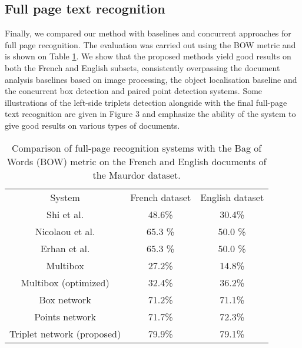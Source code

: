 \documentclass[conference]{IEEEtran}
\begin{document}
\subsection{Full page text recognition}
Finally, we compared our method with baselines and concurrent approaches for  full page recognition. The evaluation was carried out using the BOW metric and is shown on Table \ref{tab:fullPage}.
We show that the proposed methods yield good results on both the French and English subsets, consistently overpassing the document analysis baselines based on image processing, the object localisation baseline and the concurrent box detection and paired point detection systems.
Some illustrations of the left-side triplets detection alongside with the final full-page text recognition are given in Figure 3 and emphasize the ability of the system to give good results on various types of documents.

\begin{table}
\begin{center}
\caption{Comparison of full-page recognition systems with the Bag of Words (BOW) metric on the French and English documents of the Maurdor dataset. }
\label{tab:fullPage}
\begin{tabular}{c|cc}
System & French dataset & English dataset \\
\arrayrulecolor{cwblue1} \toprule
Shi et al. \cite{Shi2009a} & 48.6\% & 30.4\% \\
Nicolaou et al. \cite{Nicolaou2009} & 65.3 \% & 50.0 \% \\
\arrayrulecolor{cwblue1} \toprule
Erhan et al. & 65.3 \% & 50.0 \% \\
Multibox \cite{erhan2014scalable} & 27.2\% & 14.8\% \\
Multibox \cite{erhan2014scalable} (optimized) & 32.4\% & 36.2\% \\
\arrayrulecolor{cwblue1} \toprule
Box network \cite{moysset2016learning}  & 71.2\% & 71.1\% \\
Points network \cite{moysset2016points} & 71.7\% & 72.3\% \\
\arrayrulecolor{cwblue1} \toprule
Triplet network (proposed) & 79.9\% & 79.1\% \\
\end{tabular}
\end{center}
\end{table}
\end{document}
